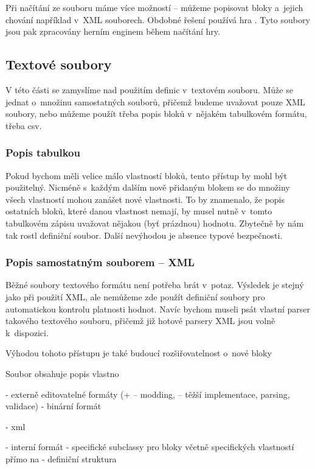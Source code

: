 Při načítání ze souboru máme více možností -- můžeme popisovat bloky a~jejich chování například v~XML souborech. Obdobné řešení používá hra \ME{}. Tyto soubory jsou pak zpracovány herním enginem během načítání hry. 

\subsection{Textové soubory}
V této části se zamyslíme nad použitím definic v~textovém souboru. Může se jednat o~množinu samostatných souborů, přičemž budeme uvažovat pouze XML soubory, nebo můžeme použít třeba popis bloků v~nějakém tabulkovém formátu, třeba csv.

\subsubsection{Popis tabulkou}
Pokud bychom měli velice málo vlastností bloků, tento přístup by mohl být použitelný. Nicméně s~každým dalším nově přidaným blokem se do množiny všech vlastností mohou zanášet nové vlastnosti.  To by znamenalo, že popis ostatních bloků, které danou vlastnost nemají, by musel nutně v~tomto tabulkovém zápisu uvažovat nějakou (byť prázdnou) hodnotu. Zbytečně by nám tak rostl definiční soubor. Další nevýhodou je absence typové bezpečnosti. 

\subsubsection{Popis samostatným souborem -- XML}
Běžné soubory textového formátu není potřeba brát v~potaz. Výsledek je stejný jako při použití XML, ale nemůžeme zde použít definiční soubory pro automatickou kontrolu platnosti hodnot. Navíc bychom museli psát vlastní parser takového textového souboru, přičemž již hotové parsery XML jsou volně k~dispozici. 

Výhodou tohoto přístupu je také budoucí rozšiřovatelnost o~nové bloky

Soubor obsahuje popis vlastno

- externě editovatelné formáty (+ -- modding, -- těžší implementace, parsing, validace)
- binární formát

- xml


- interní formát
- specifické subclassy pro bloky včetně specifických vlastností přímo na 
- definiční struktura





